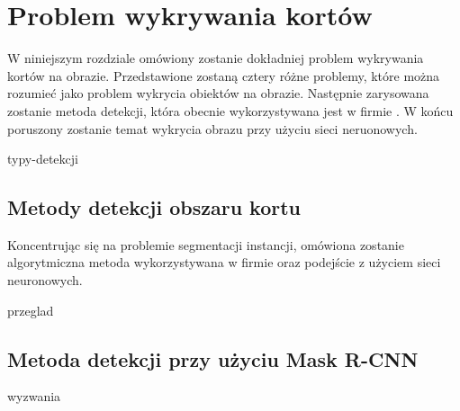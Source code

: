\chapter{Problem wykrywania kortów}

W niniejszym rozdziale omówiony zostanie dokładniej problem wykrywania kortów na obrazie.
Przedstawione zostaną cztery różne problemy, które można rozumieć jako problem wykrycia obiektów na obrazie.
Następnie zarysowana zostanie metoda detekcji, która obecnie wykorzystywana jest w firmie \blue.
W końcu poruszony zostanie temat wykrycia obrazu przy użyciu sieci neruonowych.

{typy-detekcji}

\section{Metody detekcji obszaru kortu}
\label{sec:metody_detekcji}

Koncentrując się na problemie segmentacji instancji, omówiona zostanie algorytmiczna metoda wykorzystywana w firmie \blue oraz podejście z użyciem sieci neuronowych. \\


{przeglad}

\section{Metoda detekcji przy użyciu Mask R-CNN}
{wyzwania}
